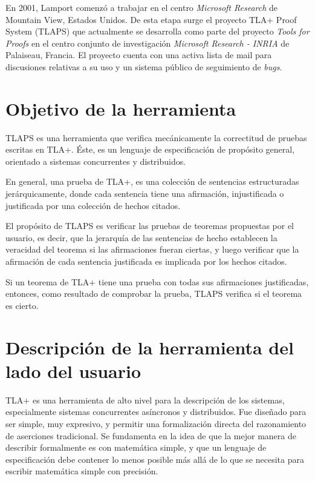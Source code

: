 \documentclass[spanish]{llncs}
\begin{document}
En 2001, Lamport comenzó a trabajar en el centro \textit{Microsoft Research} de Mountain View, Estados Unidos. De esta etapa surge el proyecto TLA+ Proof System (TLAPS) que actualmente se desarrolla como parte del proyecto \textit{Tools for Proofs} en el centro conjunto de investigación \textit{Microsoft Research - INRIA} de Palaiseau, Francia. El proyecto cuenta con una activa lista de mail para discusiones relativas a su uso y un sistema público de seguimiento de \textit{bugs}.


\section{Objetivo de la herramienta}

TLAPS es una herramienta que verifica mecánicamente la correctitud
de pruebas escritas en TLA+.
Éste, es un lenguaje de especificación de propósito general, orientado a sistemas
concurrentes y distribuidos.

En general, una prueba de TLA+, es una colección de sentencias estructuradas jerárquicamente,
donde cada sentencia tiene una afirmación, injustificada o justificada por una colección de hechos citados.

El propósito de TLAPS es verificar las pruebas de teoremas propuestas por el usuario, es decir,
que la jerarquía de las sentencias de hecho establecen la veracidad del teorema si las afirmaciones fueran ciertas,
y luego verificar que la afirmación de cada sentencia justificada es implicada por los hechos citados.

Si un teorema de TLA+ tiene una prueba con todas sus afirmaciones justificadas, entonces, como resultado
de comprobar la prueba, TLAPS verifica si el teorema es cierto.

\section{Descripción de la herramienta del lado del usuario}

TLA+ es una herramienta de alto nivel para la descripción de los sistemas, especialmente sistemas concurrentes asíncronos y distribuidos. Fue diseñado para ser simple, muy expresivo, 
y permitir una formalización directa del razonamiento de aserciones tradicional.
Se fundamenta en la idea de que la mejor manera de describir formalmente es con matemática simple, y que un lenguaje de especificación debe contener lo menos posible más allá de lo 
que se necesita para escribir matemática simple con precisión.
\end{document}
